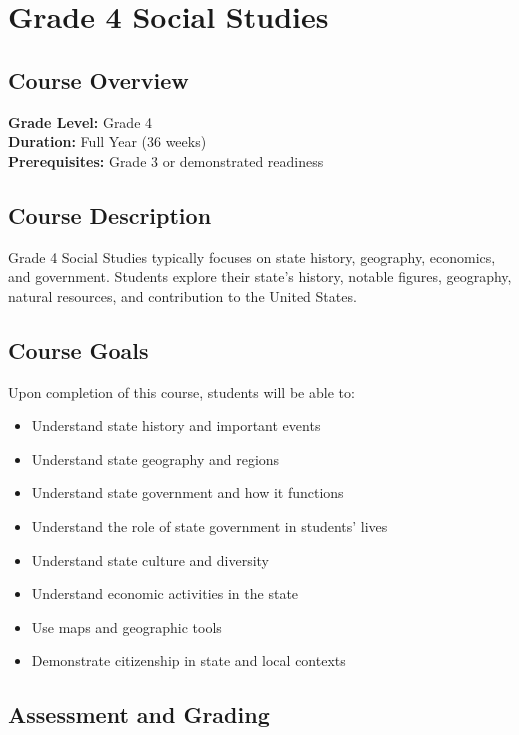 \documentclass[11pt,letterpaper]{report}
\begin{document}
\chapter{Grade 4 Social Studies}

\section{Course Overview}

\textbf{Grade Level:} Grade 4\\
\textbf{Duration:} Full Year (36 weeks)\\
\textbf{Prerequisites:} Grade 3 or demonstrated readiness

\section{Course Description}

Grade 4 Social Studies typically focuses on state history, geography, economics, and government. Students explore their state's history, notable figures, geography, natural resources, and contribution to the United States.

\section{Course Goals}

Upon completion of this course, students will be able to:

\begin{itemize}
    \item Understand state history and important events
    \item Understand state geography and regions
    \item Understand state government and how it functions
    \item Understand the role of state government in students' lives
    \item Understand state culture and diversity
    \item Understand economic activities in the state
    \item Use maps and geographic tools
    \item Demonstrate citizenship in state and local contexts
\end{itemize}

\section{Assessment and Grading}
\end{document}
